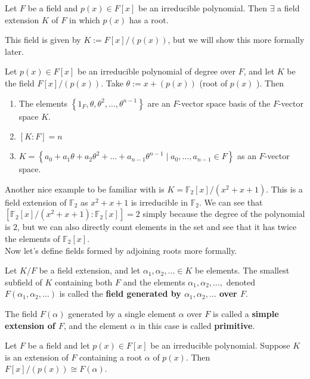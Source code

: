 \documentclass{memoir}
\begin{document}

\begin{thm}
	Let \(F\) be a field and \(p(x) \in F[x]\) be an irreducible polynomial. Then \(\exists \) a field extension \(K\) of \(F\) in which \(p(x)\) has a root.
\end{thm}
This field is given by \(K := F[x] / (p(x))\), but we will show this more formally later.

\begin{thm}
	Let \(p(x) \in F[x]\) be an irreducible polynomial of degree over \(F\), and let \(K\) be the field \(F[x] / (p(x))\). Take \(\theta := x + (p(x))\) (root of \(p(x)\) ). Then
	\begin{enumerate}
		\item The elements \(\left\{ 1_F, \theta , \theta ^2, \ldots, \theta ^{n-1} \right\} \) are an \(F\)-vector space basis of the \(F\)-vector space \(K\).
		\item \([K:F] = n\) 
		\item \(K = \left\{a_0 + a_1\theta + a_2\theta^2 + \ldots + a_{n-1}\theta ^{n-1} \mid a_0,\ldots,a_{n-1} \in F \right\} \) as an \(F\)-vector space.
	\end{enumerate}
\end{thm}
Another nice example to be familiar with is \(K = \mathbb{F}_2[x] / (x^2+x+1)\). This is a field extension of \(\mathbb{F}_2\) as \(x^2+x+1\) is irreducible in \(\mathbb{F}_2\). We can see that \([\mathbb{F}_2[x] / (x^2+x+1) : \mathbb{F}_2[x]] = 2\) simply because the degree of the polynomial is \(2\), but we can also directly count elements in the set and see that it has twice the elements of \(\mathbb{F}_2[x]\).\\

Now let's define fields formed by adjoining roots more formally.

\begin{defn}
	Let \(K / F\) be a field extension, and let \(\alpha_1,\alpha_2,\ldots \in K\) be elements. The smallest subfield of \(K\) containing both \(F\) and the elements \(\alpha_1,\alpha_2,\ldots,\) denoted \(F(\alpha_1,\alpha_2,\ldots)\) is called the \textbf{field generated by \(\alpha_1, \alpha_2,\ldots\) over \(F\)}.
\end{defn}

\begin{defn}
	The field \(F(\alpha )\) generated by a single element \(\alpha \) over \(F\) is called a \textbf{simple extension of \(F\)}, and the element \(\alpha \) in this case is called \textbf{primitive}.
\end{defn}

\begin{thm}
	Let \(F\) be a field and let \(p(x) \in F[x]\) be an irreducible polynomial. Suppose \(K\) is an extension of \(F\) containing a root \(\alpha \) of \(p(x)\). Then \(F[x] / (p(x)) \cong F(\alpha )\).
\end{thm}
\end{document}
